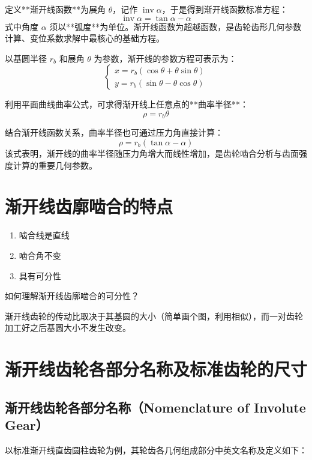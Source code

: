 定义**渐开线函数**为展角 $\theta$，记作 $\operatorname{inv}\alpha$，于是得到渐开线函数标准方程：
\begin{equation}
	\operatorname{inv} \alpha = \tan \alpha - \alpha
\end{equation}
式中角度 $\alpha$ 须以**弧度**为单位。渐开线函数为超越函数，是齿轮齿形几何参数计算、变位系数求解中最核心的基础方程。

以基圆半径 $r_b$ 和展角 $\theta$ 为参数，渐开线的参数方程可表示为：
\[
\begin{cases}
	x = r_b(\cos\theta + \theta\sin\theta)\\
	y = r_b(\sin\theta - \theta\cos\theta)
\end{cases}
\]

利用平面曲线曲率公式，可求得渐开线上任意点的**曲率半径**：
\[
\rho = r_b \theta
\]

结合渐开线函数关系，曲率半径也可通过压力角直接计算：
\[
\rho = r_b (\tan\alpha - \alpha)
\]
该式表明，渐开线的曲率半径随压力角增大而线性增加，是齿轮啮合分析与齿面强度计算的重要几何参数。

\section{渐开线齿廓啮合的特点}
\begin{enumerate}
	\item 啮合线是直线
	\item 啮合角不变
	\item 具有可分性
\end{enumerate}
\begin{proposition}
	如何理解渐开线齿廓啮合的可分性？
\end{proposition}
渐开线齿轮的传动比取决于其基圆的大小（简单画个图，利用相似），而一对齿轮加工好之后基圆大小不发生改变。


\section{渐开线齿轮各部分名称及标准齿轮的尺寸}

\subsection{渐开线齿轮各部分名称（Nomenclature of Involute Gear）}
以标准渐开线直齿圆柱齿轮为例，其轮齿各几何组成部分中英文名称及定义如下：

